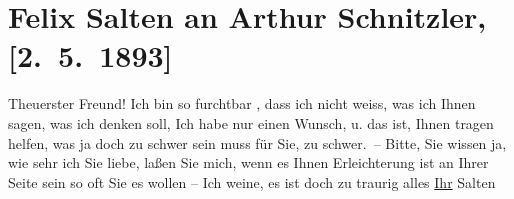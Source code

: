 

         
         \renewcommand{\erwaehntePersonen}{Personen: Felix Salten, Johann Schnitzler}
         \renewcommand{\erwaehnteOrte}{Orte: Wien}
         \renewcommand{\erwaehnteWerke}{}
               \section[Felix Salten an Arthur Schnitzler, {[}2. 5. 1893{]}]{ Felix Salten an Arthur Schnitzler, {[}2. 5. 1893{]}}\nopagebreak{}\rehead{ }\begin{ledgroupsized}[t]{13cm}\normalsize\beginnumbering{} \toendnotes[C]{\smallbreak\pagebreak[2]} 
\toendnotes[C]{\smallbreak}\pstart
           \noindent{}{\pb}Theuerster Freund! Ich bin so furchtbar \label{K_L03122-1v}\label{K_L03122-1h},
               dass ich nicht weiss, was ich Ihnen sagen, was ich denken soll, Ich habe nur einen
               Wunsch, u. das ist, Ihnen tragen helfen, was ja doch {\pb}zu schwer sein muss für Sie, zu
               schwer. – Bitte, Sie wissen ja, wie sehr ich Sie liebe, laßen Sie mich, wenn es
               Ihnen Erleichterung ist an Ihrer Seite sein so oft Sie es \label{T_L03122-1v}\label{T_L03122-1h} wollen – \pend
           \pstart
           Ich weine, es ist doch zu traurig alles\pend
           \pstart \uline{Ihr}{ }\spacefill\mbox{Salten}\pend{}
         
         \endnumbering{}\end{ledgroupsized}  \newcommand{\dateiname}{L03122}\newcommand{\titel}{Felix Salten an Arthur Schnitzler, [2. 5. 1893]}\newcommand{\editorInnen}{Martin Anton Müller und Laura Untner}
      